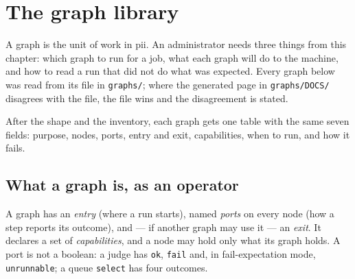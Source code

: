 \chapter{The graph library}

\label{ch:graphs}

A graph is the unit of work in pii. An administrator needs three things from this chapter:
which graph to run for a job, what each graph will do to the machine, and how to read a run
that did not do what was expected. Every graph below was read from its file in
\texttt{graphs/}; where the generated page in \texttt{graphs/DOCS/} disagrees with the file,
the file wins and the disagreement is stated.

After the shape and the inventory, each graph gets one table with the same seven fields:
purpose, nodes, ports, entry and exit, capabilities, when to run, and how it fails.

\section{What a graph is, as an operator}

A graph has an \emph{entry} (where a run starts), named \emph{ports} on every node (how a step
reports its outcome), and --- if another graph may use it --- an \emph{exit}. It declares a
set of \emph{capabilities}, and a node may hold only what its graph holds. A port is not a
boolean: a judge has \texttt{ok}, \texttt{fail} and, in fail-expectation mode,
\texttt{unrunnable}; a queue \texttt{select} has four outcomes.

\begin{center}
\begin{minipage}{\linewidth}
\centering
{}
\end{minipage}
\end{center}

